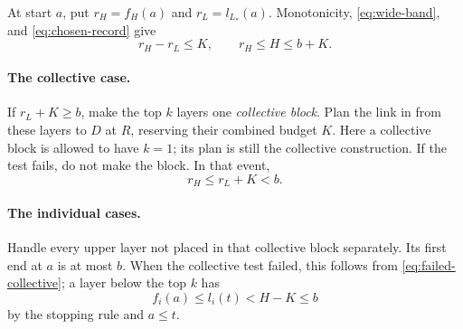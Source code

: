 At start $a$, put $r_H=f_H(a)$ and $r_L=l_{L_*}(a)$. Monotonicity, \eqref{eq:wide-band}, and \eqref{eq:chosen-record} give
\begin{equation}\label{eq:block-preconditions}
r_H-r_L\le K,
\qquad r_H\le H\le b+K.
\end{equation}

\paragraph{The collective case.}
If $r_L+K\ge b$, make the top $k$ layers one \emph{collective block}. Plan the link in  from these layers to $D$ at $R$, reserving their combined budget $K$. Here a collective block is allowed to have $k=1$; its plan is still the collective construction. If the test fails, do not make the block. In that event,
\begin{equation}\label{eq:failed-collective}
r_H\le r_L+K<b.
\end{equation}

\paragraph{The individual cases.}
Handle every upper layer not placed in that collective block separately. Its first end at $a$ is at most $b$. When the collective test failed, this follows from \eqref{eq:failed-collective}; a layer below the top $k$ has
\[
f_i(a)\le l_i(t)<H-K\le b
\]
by the stopping rule and $a\le t$.

